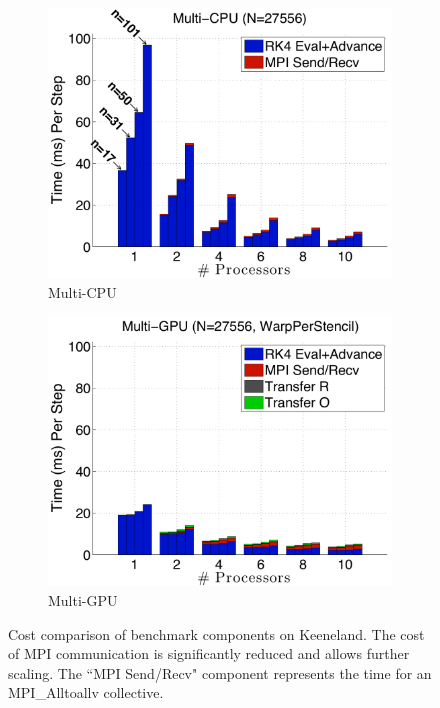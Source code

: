 \begin{figure}
\centering
\begin{subfigure}[t]{0.425\textwidth}
\centering
\includegraphics[width=1.0\textwidth]{../figures/keeneland_results/alltoallv/multiCPU_costs.pdf}
\caption{Multi-CPU}
\label{fig:alltoall_multicpu_costs}
\end{subfigure} 
\begin{subfigure}[t]{0.425\textwidth}
\centering
\includegraphics[width=1.0\textwidth]{../figures/keeneland_results/alltoallv/multiGPU_warp_costs.pdf}
\caption{Multi-GPU}
\label{fig:alltoall_multigpu_costs}
\end{subfigure} 
\caption{Cost comparison of benchmark components on Keeneland. The cost of MPI communication is significantly reduced and allows further scaling. The ``MPI Send/Recv" component represents the time for an MPI\_Alltoallv collective.}
\end{figure} 


